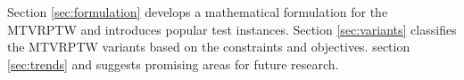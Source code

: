 
Section \ref{sec:formulation} develops a mathematical formulation for the MTVRPTW and introduces popular test instances.  Section \ref{sec:variants} classifies the MTVRPTW variants based on the constraints and objectives.  %
 section \ref{sec:trends}  and suggests promising areas for future research.
